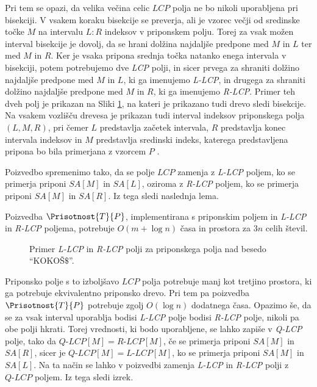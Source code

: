 Pri tem se opazi, da velika večina celic $LCP$ polja ne bo nikoli uporabljena pri bisekciji. V vsakem koraku bisekcije se preverja, ali je vzorec večji od sredinske točke $M$ na intervalu $L:R$ indeksov v priponskem polju. Torej za vsak možen interval bisekcije je dovolj, da se hrani dolžina najdaljše predpone med $M$ in $L$ ter med $M$ in $R$. Ker je vsaka pripona srednja točka natanko enega intervala v bisekciji, potem potrebujemo dve \textit{LCP} polji, in sicer prvega za shraniti dolžino najdaljše predpone med $M$ in $L$, ki ga imenujemo \textit{L-LCP}, in drugega za shraniti dolžino najdaljše predpone med $M$ in $R$, ki ga imenujemo \textit{R-LCP}. Primer teh dveh polj je prikazan na Sliki \ref{fig:RlcpLlcpSuffuxArray}, na kateri je prikazano tudi drevo sledi bisekcije. Na vsakem vozlišču drevesa je prikazan tudi interval indeksov priponskega polja $(L,M,R)$, pri čemer $L$ predstavlja začetek intervala, $R$ predstavlja konec intervala indeksov in $M$ predstavlja sredinski indeks, katerega predstavljena pripona bo bila primerjana z vzorcem $P$ \cite{Manber1990}. 

Poizvedbo spremenimo tako, da se polje $LCP$ zamenja z \textit{L-LCP} poljem, ko se primerja priponi $SA[M]$ in $SA[L]$, oziroma z \textit{R-LCP} poljem, ko se primerja priponi $SA[M]$ in $SA[R]$. Iz tega sledi naslednja lema.

\begin{lema}\label{lema:LRLCP}
    Poizvedba $\Prisotnost{T}{P}$, implementirana s priponskim poljem in \textit{L-LCP} in \textit{R-LCP} poljema, potrebuje $O(m+\log{n})$ časa in prostora za $3n$ celih števil.
\end{lema}

\begin{figure}[tb] 
    
    \centering
    \caption{Primer \textit{L-LCP} in \textit{R-LCP} polji za priponskega polja nad besedo \enquote{KOKOŠ$\$$}.} 
    \label{fig:RlcpLlcpSuffuxArray}
\end{figure}

Priponsko polje s to izboljšavo $LCP$ polja potrebuje manj kot tretjino prostora, ki ga potrebuje ekvivalentno priponsko drevo. Pri tem pa poizvedba $\Prisotnost{T}{P}$ potrebuje zgolj $O(\log{n})$ dodatnega časa. Opazimo še, da se za vsak interval uporablja bodisi \textit{L-LCP} polje bodisi \textit{R-LCP} polje, nikoli pa obe polji hkrati. Torej vrednosti, ki bodo uporabljene, se lahko zapiše v \textit{Q-LCP} polje, tako da $\textit{Q-LCP}[M]= \textit{R-LCP}[M]$, če se primerja priponi $SA[M]$ in $SA[R]$, sicer je $\textit{Q-LCP}[M]= \textit{L-LCP}[M]$, ko se primerja priponi $SA[M]$ in $SA[L]$. Na ta način se lahko v poizvedbi zamenja \textit{L-LCP} in \textit{R-LCP} polji z $\textit{Q-LCP}$ poljem. Iz tega sledi izrek.

